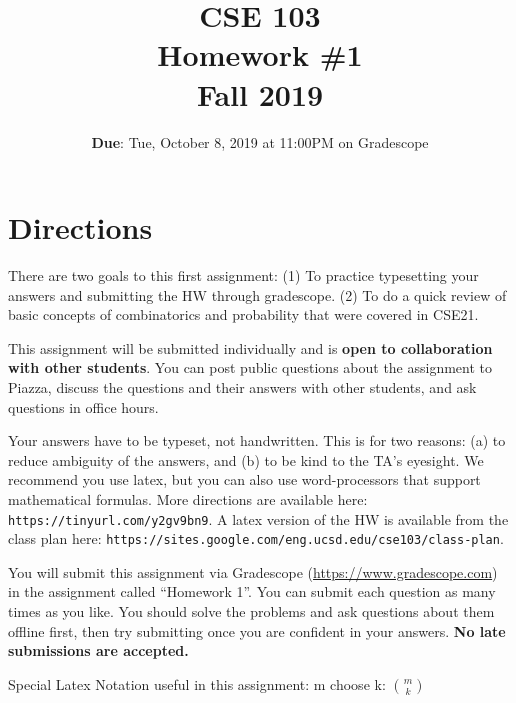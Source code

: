 \documentclass[12pt, oneside]{article}
\title{\bf CSE 103 \\[2ex]
       \Large Homework \#1\\ Fall 2019}
\begin{document}
\date{\textbf{Due}: Tue, October 8, 2019 at 11:00PM on Gradescope}
\maketitle

\section{Directions}
There are two goals to this first assignment: (1) To practice
typesetting your answers and submitting the HW through gradescope. (2)
To do a quick review of basic concepts of combinatorics and probability
that were covered in CSE21.

This assignment will be submitted individually and is \textbf{open to
collaboration with other students}.  You can post public questions about the
assignment to Piazza, discuss the questions and their answers with other
students, and ask questions in office hours. 

Your answers have to be typeset, not handwritten. This is for two
reasons: (a) to reduce ambiguity of the answers, and (b) to be kind to
the TA's eyesight. We recommend you use latex, but you can also use
word-processors that support mathematical formulas. More directions
are available here: {\tt https://tinyurl.com/y2gv9bn9}. A latex
version of the HW is available from the class plan here: {\tt https://sites.google.com/eng.ucsd.edu/cse103/class-plan}.

You will submit this assignment via Gradescope
(\url{https://www.gradescope.com}) in the assignment called ``Homework
1''. You can submit each question as many times as you like. You should solve the problems and ask
questions about them offline first, then try submitting once you are confident
in your answers. \textbf{No late submissions are accepted.}


Special Latex Notation useful in this assignment: m choose k: ${m
  \choose k}$
\end{document}
